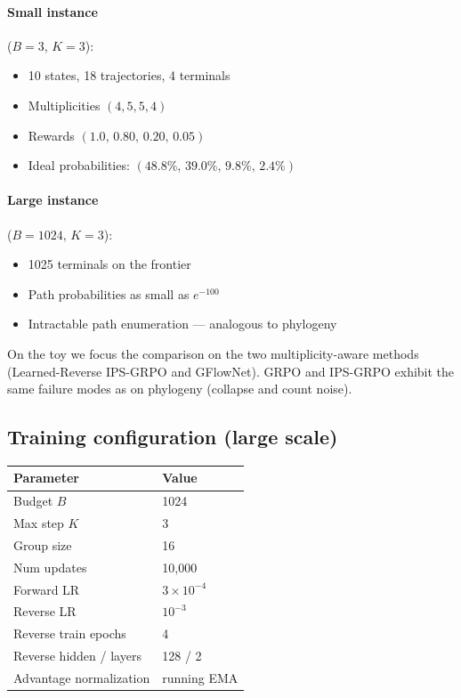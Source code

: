 \documentclass[11pt]{article}
\begin{document}
\paragraph{Small instance} (\(B=3\), \(K=3\)):
\begin{itemize}
    \item 10 states, 18 trajectories, 4 terminals
    \item Multiplicities \((4,5,5,4)\)
    \item Rewards \((1.0,\,0.80,\,0.20,\,0.05)\)
    \item Ideal probabilities: \((48.8\%,\,39.0\%,\,9.8\%,\,2.4\%)\)
\end{itemize}

\paragraph{Large instance} (\(B=1024\), \(K=3\)):
\begin{itemize}
    \item 1025 terminals on the frontier
    \item Path probabilities as small as \(e^{-100}\)
    \item Intractable path enumeration --- analogous to phylogeny
\end{itemize}

On the toy we focus the comparison on the two multiplicity-aware methods (Learned-Reverse IPS-GRPO and GFlowNet). GRPO and IPS-GRPO exhibit the same failure modes as on phylogeny (collapse and count noise).

\subsection{Training configuration (large scale)}

\begin{center}
\begin{tabular}{@{}ll@{}}
\toprule
Parameter & Value \\
\midrule
Budget \(B\) & 1024 \\
Max step \(K\) & 3 \\
Group size & 16 \\
Num updates & 10{,}000 \\
Forward LR & \(3\times 10^{-4}\) \\
Reverse LR & \(10^{-3}\) \\
Reverse train epochs & 4 \\
Reverse hidden / layers & 128 / 2 \\
Advantage normalization & running EMA \\
\bottomrule
\end{tabular}
\end{center}
\end{document}

